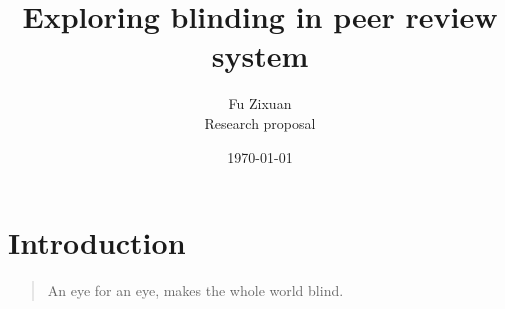 \documentclass[12pt]{article}
\title{Exploring blinding in peer review system}
\author{Fu Zixuan \\{\small {Research proposal}}}
\date{\today}
\begin{document}
\maketitle




\section{Introduction}
\begin{quote}
    An eye for an eye, makes the whole world blind. \cite{gandhi}
\end{quote}
\end{document}
